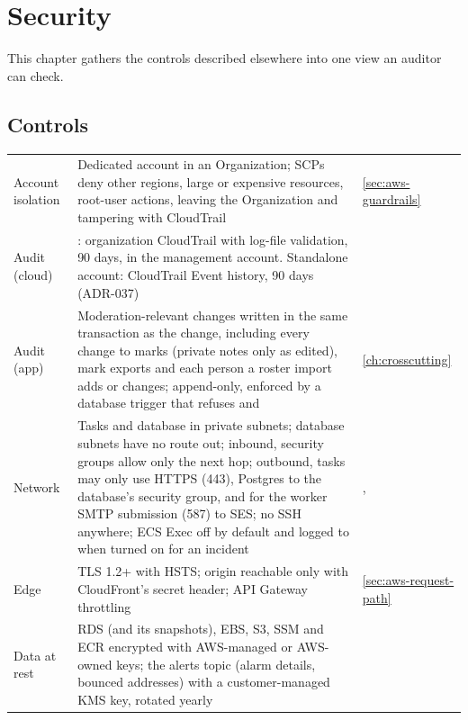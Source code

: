 \chapter{Security}\label{ch:security}

This chapter gathers the controls described elsewhere into one view an auditor can check.

\section{Controls}
\begin{xltabular}{\linewidth}{@{}P{30mm} L P{26mm}@{}}
  \toprule
   &  & \\
  \midrule
  \endhead
  Account isolation & Dedicated account in an Organization; SCPs deny other regions, large or expensive resources, root-user actions, leaving the Organization and tampering with CloudTrail & \cref{sec:aws-guardrails}\\
  Audit (cloud) & : organization CloudTrail with log-file validation, 90 days, in the management account. Standalone account: CloudTrail Event history, 90 days (ADR-037) & \\
  Audit (app) & Moderation-relevant changes written in the same transaction as the change, including every change to marks (private notes only as edited), mark exports and each person a roster import adds or changes; append-only, enforced by a database trigger that refuses  and  & \cref{ch:crosscutting}\\
  Network & Tasks and database in private subnets; database subnets have no route out; inbound, security groups allow only the next hop; outbound, tasks may only use HTTPS (443), Postgres to the database's security group, and for the worker SMTP submission (587) to SES; no SSH anywhere; ECS Exec off by default and logged to  when turned on for an incident & , \\
  Edge & TLS 1.2+ with HSTS; origin reachable only with CloudFront's secret header; API Gateway throttling & \cref{sec:aws-request-path}\\
  Data at rest & RDS (and its snapshots), EBS, S3, SSM and ECR encrypted with AWS-managed or AWS-owned keys; the alerts topic (alarm details, bounced addresses) with a customer-managed KMS key, rotated yearly & \\

\end{xltabular}
